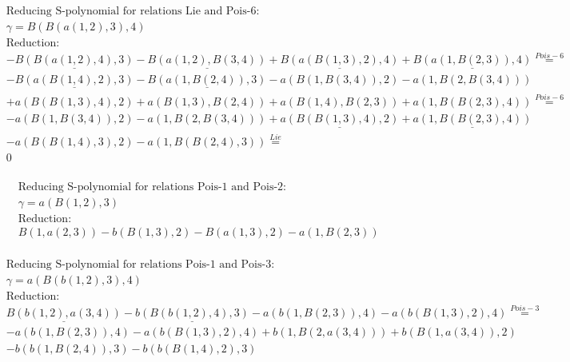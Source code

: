 \documentclass[11pt]{amsart}
\begin{document}
\begin{align*} 
& \text{Reducing S-polynomial for relations Lie and Pois-6:} \\ 
& \gamma = B(B(a(1,2),3),4) \\ 
& \text{Reduction}: \\& - \underline{B(B(a(1,2),4),3)} - \underline{B(a(1,2),B(3,4))} + \underline{B(a(B(1,3),2),4)} + \underline{B(a(1,B(2,3)),4)} \stackrel{ Pois-6 }{=}  \\ 
& - \underline{B(a(B(1,4),2),3)} - \underline{B(a(1,B(2,4)),3)} - a(B(1,B(3,4)),2) - a(1,B(2,B(3,4)))\\ 
 &  + a(B(B(1,3),4),2) + a(B(1,3),B(2,4)) + a(B(1,4),B(2,3)) + a(1,B(B(2,3),4)) \stackrel{ Pois-6 }{=}  \\ 
& - a(B(1,B(3,4)),2) - a(1,B(2,B(3,4))) + \underline{a(B(B(1,3),4),2)} + \underline{a(1,B(B(2,3),4))}\\ 
 &  - a(B(B(1,4),3),2) - a(1,B(B(2,4),3)) \stackrel{ Lie }{=}  \\ 
&0\\ 
\end{align*} 
 
\begin{align*} 
& \text{Reducing S-polynomial for relations Pois-1 and Pois-2:} \\ 
& \gamma = a(B(1,2),3) \\ 
& \text{Reduction}: \\&B(1,a(2,3)) - b(B(1,3),2) - B(a(1,3),2) - a(1,B(2,3))\\ 
\end{align*} 
 
\begin{align*} 
& \text{Reducing S-polynomial for relations Pois-1 and Pois-3:} \\ 
& \gamma = a(B(b(1,2),3),4) \\ 
& \text{Reduction}: \\&\underline{B(b(1,2),a(3,4))} - \underline{b(B(b(1,2),4),3)} - a(b(1,B(2,3)),4) - a(b(B(1,3),2),4) \stackrel{ Pois-3 }{=}  \\ 
& - a(b(1,B(2,3)),4) - a(b(B(1,3),2),4) + b(1,B(2,a(3,4))) + b(B(1,a(3,4)),2)\\ 
 &  - b(b(1,B(2,4)),3) - b(b(B(1,4),2),3)\\ 
\end{align*} 
 
\end{document}
